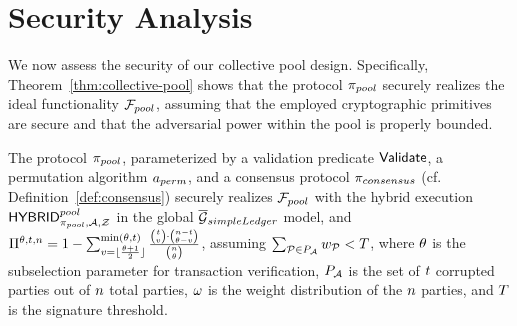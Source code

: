 \section{Security Analysis}\label{sec:security}

We now assess the security of our collective pool design. Specifically,
Theorem~\ref{thm:collective-pool} shows that the protocol $\pi_{pool}$ securely
realizes the ideal functionality ${\mathcal{F}}_{pool}$, assuming that the employed
cryptographic primitives are secure and that the adversarial power within the
pool is properly bounded.

\begin{theorem}\label{thm:collective-pool}
    The protocol $\pi_{pool}$, parameterized by a validation predicate
    $\mathsf{Validate}$, a permutation algorithm $a_{perm}$, and a consensus
    protocol $\pi_{consensus}$ (cf. Definition~\ref{def:consensus})
    securely realizes ${\mathcal{F}}_{pool}$ with the hybrid execution ${\mathsf{HYBRID}^{pool}_{\pi_{pool}, \mathcal{A}, \mathcal{Z}}}$ in the
    global ${\overline{\mathcal{G}}}_{simpleLedger}$ model, and
    $\Pi^{\theta, t, n} = 1 - \sum_{v = \lfloor \frac{\theta + 1}{2} \rfloor}^{\min (\theta, t)} \frac{ {t \choose v} \cdot {{n- t} \choose {\theta- v}} }{ {n \choose \theta} }$,
    assuming $\sum_{\mathcal{P} \in P_{\mathcal{A}}} w_{\mathcal{P}} < T$, where
    $\theta$ is the subselection parameter for transaction
    verification, $P_{\mathcal{A}}$ is the set of $t$ corrupted
    parties out of $n$ total parties, $\omega$ is the weight
    distribution of the $n$ parties, and $T$ is the signature
    threshold.
\end{theorem}

